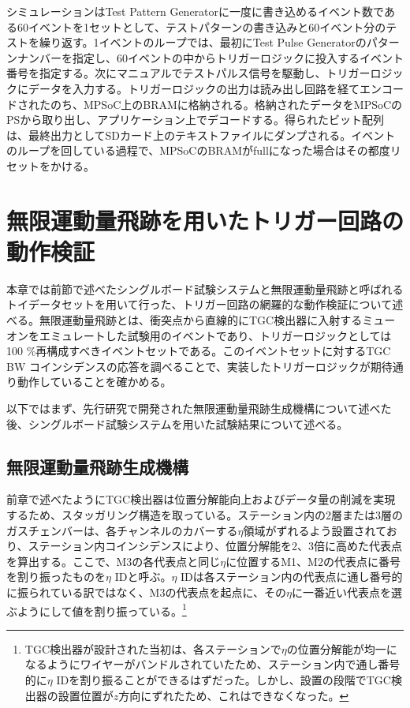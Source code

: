 シミュレーションはTest Pattern Generatorに一度に書き込めるイベント数である60イベントを1セットとして、テストパターンの書き込みと60イベント分のテストを繰り返す。1イベントのループでは、最初にTest Pulse Generatorのパターンナンバーを指定し、60イベントの中からトリガーロジックに投入するイベント番号を指定する。次にマニュアルでテストパルス信号を駆動し、トリガーロジックにデータを入力する。トリガーロジックの出力は読み出し回路を経てエンコードされたのち、MPSoC上のBRAMに格納される。格納されたデータをMPSoCのPSから取り出し、アプリケーション上でデコードする。得られたビット配列は、最終出力としてSDカード上のテキストファイルにダンプされる。イベントのループを回している過程で、MPSoCのBRAMがfullになった場合はその都度リセットをかける。

\section{無限運動量飛跡を用いたトリガー回路の動作検証}
\label{sec_IMT}

本章では前節で述べたシングルボード試験システムと無限運動量飛跡と呼ばれるトイデータセットを用いて行った、トリガー回路の網羅的な動作検証について述べる。無限運動量飛跡とは、衝突点から直線的にTGC検出器に入射するミューオンをエミュレートした試験用のイベントであり、トリガーロジックとしては100 \%再構成すべきイベントセットである。このイベントセットに対するTGC BW コインシデンスの応答を調べることで、実装したトリガーロジックが期待通り動作していることを確かめる。

以下ではまず、先行研究で開発された無限運動量飛跡生成機構について述べた後、シングルボード試験システムを用いた試験結果について述べる。

\subsection*{無限運動量飛跡生成機構}
\label{subsec_IMT_generation}

前章で述べたようにTGC検出器は位置分解能向上およびデータ量の削減を実現するため、スタッガリング構造を取っている。ステーション内の2層または3層のガスチェンバーは、各チャンネルのカバーする$\eta$領域がずれるよう設置されており、ステーション内コインシデンスにより、位置分解能を2、3倍に高めた代表点を算出する。ここで、M3の各代表点と同じ$\eta$に位置するM1、M2の代表点に番号を割り振ったものを$\eta$ IDと呼ぶ。$\eta$ IDは各ステーション内の代表点に通し番号的に振られている訳ではなく、M3の代表点を起点に、その$\eta$に一番近い代表点を選ぶようにして値を割り振っている。\footnote{TGC検出器が設計された当初は、各ステーションで$\eta$の位置分解能が均一になるようにワイヤーがバンドルされていたため、ステーション内で通し番号的に$\eta$ IDを割り振ることができるはずだった。しかし、設置の段階でTGC検出器の設置位置が$z$方向にずれたため、これはできなくなった。}

